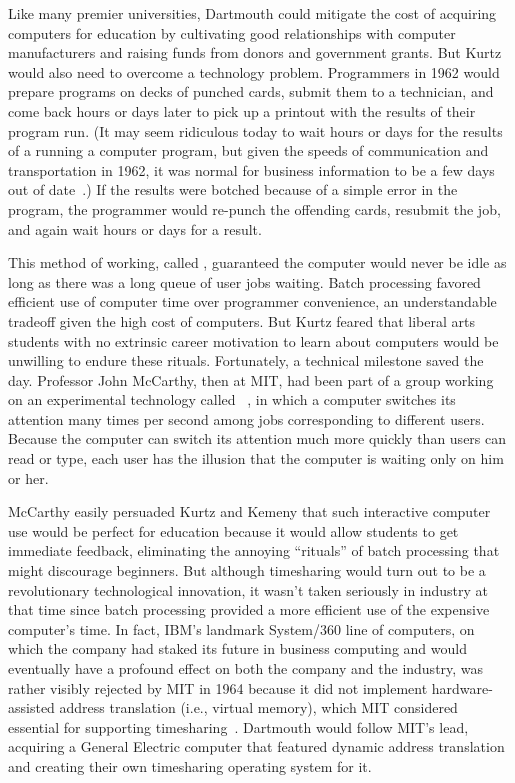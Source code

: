 Like many premier universities, Dartmouth could mitigate the cost of
acquiring computers for education by cultivating good relationships with
computer manufacturers and raising funds from donors and government
grants.
But Kurtz would also need to overcome a technology problem.
Programmers in 1962 would prepare programs on decks of punched cards,
submit them to a technician,
and come back hours or days later to pick up a printout with
the results of their program run.
(It may seem ridiculous today to wait hours or days for the results of a
running a computer program, but given the speeds of 
communication and transportation in 1962, it was normal for
business information to be a few days out of
date~\cite{ceruzzi}.) 
If the results were botched because of a simple error in the program,
the programmer would re-punch the offending cards, resubmit the job, and
again wait hours or days for a result.

This method of working, called , guaranteed the
computer would never be idle as long as there was a long queue of user
jobs waiting.
Batch processing favored efficient use of computer time over
programmer convenience, an understandable
tradeoff given the high cost of computers.
But Kurtz feared that liberal arts students with no
extrinsic career motivation to learn about computers would be unwilling
to endure these rituals.
Fortunately, a technical milestone saved the day.
Professor John McCarthy, then at MIT, had been part of a group working
on an experimental technology called
~\cite{corbato62timesharing}, in which a computer
switches its attention many times per second among jobs corresponding to
different users.
Because the computer can switch its attention much more quickly than
users can read or type, each user has the illusion that the computer
is waiting only on him or her.

McCarthy easily persuaded Kurtz and Kemeny that such interactive
computer use would be perfect for education because it would allow
students to get
immediate feedback, eliminating the annoying ``rituals'' of batch
processing that might discourage beginners.
But although timesharing would turn out to be a revolutionary
technological innovation, 
it wasn't taken seriously in industry at that time since batch
processing provided a more efficient use of the expensive computer's
time.  
In fact, IBM's landmark System/360 line of computers, on which the
company had staked its future in business computing and would eventually
have a 
profound effect on both the company and the industry, was rather visibly
rejected by MIT in 1964 because it did not implement hardware-assisted 
address translation (i.e., virtual memory), which MIT considered
essential for supporting timesharing~\cite{ibm360history}.
Dartmouth would
follow MIT's lead, acquiring a General Electric computer that
featured dynamic address translation and creating their own timesharing
operating system for it.

